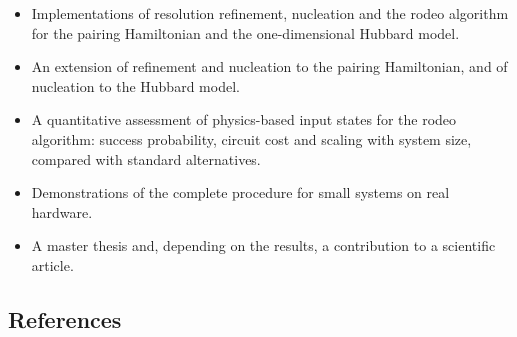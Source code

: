 \documentclass[12pt,a4paper]{article}
\begin{document}
\begin{itemize}
  \item Implementations of resolution refinement, nucleation and the rodeo algorithm for the pairing Hamiltonian and the one-dimensional Hubbard model.
  \item An extension of refinement and nucleation to the pairing Hamiltonian, and of nucleation to the Hubbard model.
  \item A quantitative assessment of physics-based input states for the rodeo algorithm: success probability, circuit cost and scaling with system size, compared with standard alternatives.
  \item Demonstrations of the complete procedure for small systems on real hardware.
  \item A master thesis and, depending on the results, a contribution to a scientific article.
\end{itemize}

\subsection*{References}
\end{document}
